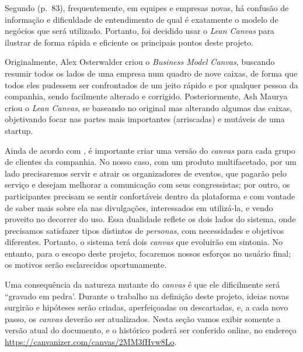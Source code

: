 \documentclass[12pt,a4paper,twoside,hyphens,english,brazil]{abntex2}
\begin{document}
Segundo \citeauthor{manual-startup} (p.~83), frequentemente, em equipes e empresas novas, há confusão de informação e dificuldade de entendimento de qual é exatamente o modelo de negócios que será utilizado. Portanto, foi decidido usar o \emph{Lean Canvas} para ilustrar de forma rápida e eficiente os principais pontos deste projeto.

Originalmente, Alex Osterwalder criou o \emph{Business Model Canvas}, buscando resumir todos os lados de uma empresa num quadro de nove caixas, de forma que todos eles pudessem ser confrontados de um jeito rápido e por qualquer pessoa da companhia, sendo facilmente alterado e corrigido. Posteriormente, Ash Maurya criou o \emph{Lean Canvas}, se baseando no original mas alterando algumas das caixas, objetivando focar nas partes mais importantes (arriscadas) e mutáveis de uma startup.\cite{why-lean-canvas}

Ainda de acordo com \citeauthor{lean-canvas}, é importante criar uma versão do \emph{canvas} para cada grupo de clientes da companhia. No nosso caso, com um produto multifacetado, por um lado precisaremos servir e atrair os organizadores de eventos, que pagarão pelo serviço e desejam melhorar a comunicação com seus congressistas; por outro, os participantes precisam se sentir confortáveis dentro da plataforma e com vontade de saber mais sobre ela nas divulgações, interessados em utilizá-la, e vendo proveito no decorrer do uso. Essa dualidade reflete os dois lados do sistema, onde precisamos satisfazer tipos distintos de \emph{personas}, com necessidades e objetivos diferentes. Portanto, o sistema terá dois \emph{canvas} que evoluirão em sintonia. No entanto, para o escopo deste projeto, focaremos nossos esforços no usuário final; os motivos serão esclarecidos oportunamente. %

Uma consequência da natureza mutante do \emph{canvas} é que ele dificilmente será ``gravado em pedra'. Durante o trabalho na definição deste projeto, ideias novas surgirão e hipóteses serão criadas, aperfeiçoadas ou descartadas, e, a cada novo passo, os \emph{canvas} deverão ser atualizados. Nesta seção vamos exibir somente a versão atual do documento, e o histórico poderá ser conferido online, no endereço \mbox{\url{https://canvanizer.com/canvas/2MM3fHvw8Lo}}.

\end{document}
